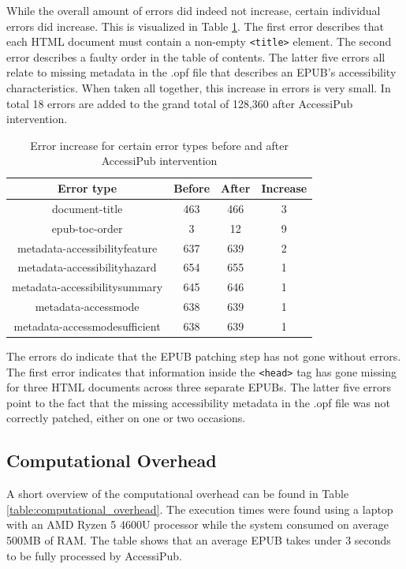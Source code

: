 While the overall amount of errors did indeed not increase, certain individual errors did increase. This is visualized in Table \ref{table:errorincrease}. The first error describes that each HTML document must contain a non-empty \texttt{<title>} element. The second error describes a faulty order in the table of contents. The latter five errors all relate to missing metadata in the .opf file that describes an EPUB's accessibility characteristics. When taken all together, this increase in errors is very small. In total 18 errors are added to the grand total of 128,360 after AccessiPub intervention. 

\begin{table}[h!]
\small
\begin{center}
\begin{tabular}{ | c || c | c | c |} 
\hline
\textbf{Error type} & \textbf{Before} & \textbf{After} & \textbf{Increase} \\
\hline
document-title & 463 & 466 & 3 \\
\hline
epub-toc-order & 3 & 12 & 9 \\
\hline
metadata-accessibilityfeature & 637 & 639 & 2 \\
\hline
metadata-accessibilityhazard & 654 & 655 & 1 \\
\hline
metadata-accessibilitysummary & 645 & 646 & 1 \\
\hline
metadata-accessmode & 638 & 639 & 1 \\
\hline
metadata-accessmodesufficient & 638 & 639 & 1 \\
\hline
\end{tabular}
\end{center}
\normalsize
\caption{Error increase for certain error types before and after AccessiPub intervention}
\label{table:errorincrease}
\end{table}

The errors do indicate that the EPUB patching step has not gone without errors. The first error indicates that information inside the \texttt{<head>} tag has gone missing for three HTML documents across three separate EPUBs. The latter five errors point to the fact that the missing accessibility metadata in the .opf file was not correctly patched, either on one or two occasions. 

\subsection{Computational Overhead}
A short overview of the computational overhead can be found in Table \ref{table:computational_overhead}. The execution times were found using a laptop with an AMD Ryzen 5 4600U processor while the system consumed on average 500MB of RAM. The table shows that an average EPUB takes under 3 seconds to be fully processed by AccessiPub.


